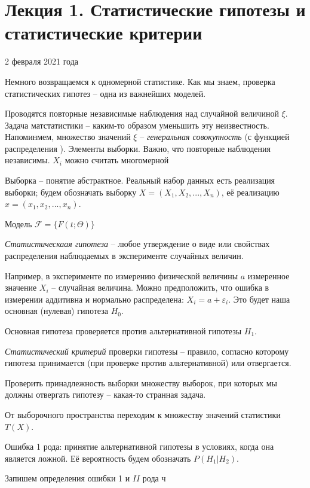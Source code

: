 \documentclass[main.tex]{subfiles}
\begin{document}
\section{Лекция 1. Статистические гипотезы и статистические критерии}

2 февраля 2021 года

Немного возвращаемся к одномерной статистике. Как мы знаем, проверка статистических гипотез -- одна из важнейших моделей.

Проводятся повторные независимые наблюдения над случайной величиной $ \xi $. Задача матстатистики -- каким-то образом уменьшить эту неизвестность. Напоминмем, множество значений $ \xi $ -- \textit{генеральная совокупность} (с функцией распределения ). Элементы выборки. Важно, что повторные наблюдения независимы. $X_i$ можно считать многомерной

Выборка -- понятие абстрактное. Реальный набор данных есть реализация выборки; будем обозначать выборку $ X = (X_1, X_2, ..., X_n) $, её реализацию $ x = (x_1, x_2, ..., x_n) $.

Модель $ \mathcal{F} = \{F(t;\Theta)\} $

\emph{Статистическаая гипотеза} -- любое утверждение о виде или свойствах распределения наблюдаемых в эксперименте случайных величин.

Например, в эксперименте по измерению физической величины $ a $ измеренное значение $ X_i $ -- случайная величина. Можно предположить, что ошибка в измерении аддитивна и нормально распределена: $ X_i = a + \varepsilon_i $. Это будет наша основная (нулевая) гипотеза $ H_0 $.

Основная гипотеза проверяется против альтернативной гипотезы $ H_1 $.

\emph{Статистический критерий} проверки гипотезы -- правило, согласно которому гипотеза принимается (при проверке против альтернативной) или отвергается.



Проверить принадлежность выборки множеству выборок, при которых мы должны отвергать гипотезу -- какая-то странная задача.

От выборочного пространства переходим к множеству значений статистики $ T(X) $.


Ошибка 1 рода: принятие альтернативной гипотезы в условиях, когда она является ложной. Её вероятность будем обозначать $ P(H_1 |H_2) $.

Запишем определения ошибки 1 и $ II $ рода ч
\end{document}
